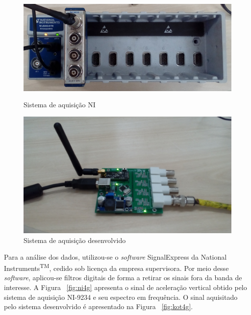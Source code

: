 \documentclass[
	12pt,				%
	openright,			%
	twoside,			%
	a4paper,			%
	english,			%
	french,				%
	spanish,			%
	brazil,				%
	]{abntex2}
\begin{document}
		\begin{figure}[H]
			\centering
			\begin{minipage}{0.4\linewidth}
				\centering
				\includegraphics[width = \linewidth]{../Fotos/cdaq.jpg}
				\caption{Sistema de aquisição NI}
				\label{fig:modulosNI}
			\end{minipage}
			\hfill\vline\hfill
			\begin{minipage}{0.4\linewidth}
				\centering
				\includegraphics[width = \linewidth]{../Fotos/DAqIEPE.jpg}
				\caption{Sistema de aquisição desenvolvido}
				\label{fig:daqIepe}
			\end{minipage}
		\end{figure}

		Para a análise dos dados, utilizou-se o \textit{software} SignalExpress da National Instruments\textsuperscript{TM}, cedido sob licença da empresa supervisora. Por meio desse \textit{software}, aplicou-se filtros digitais de forma a retirar os sinais fora da banda de interesse. A Figura ~\ref{fig:ni4g} apresenta o sinal de aceleração vertical obtido pelo sistema de aquisição NI-9234 e seu espectro em frequência. O sinal aquisitado pelo sistema desenvolvido é apresentado na Figura ~\ref{fig:kot4g}.
\end{document}
